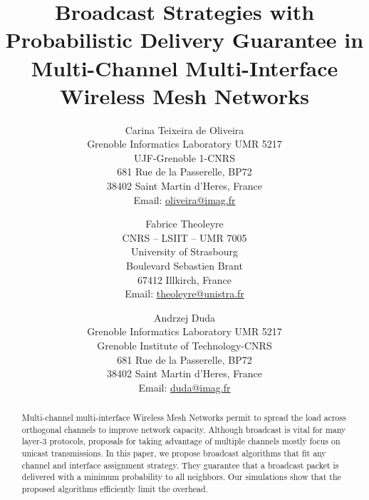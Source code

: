 \documentclass[twoside]{article}
\begin{document}
\title{\vspace{-2cm}Broadcast Strategies with Probabilistic Delivery Guarantee in Multi-Channel Multi-Interface Wireless Mesh Networks}


 
  

\author{
Carina Teixeira de Oliveira 
\vspace{0.4cm}\\
{\small Grenoble Informatics Laboratory UMR 5217}
\\
{\small  UJF-Grenoble 1-CNRS}
\\
{\small 681 Rue de la Passerelle, BP72}
\\
{\small 38402 Saint Martin d'Heres, France}
\\
{\small Email: \url{oliveira@imag.fr}}
\and Fabrice Theoleyre
\vspace{0.4cm}\\
{\small CNRS -- LSIIT  -- UMR 7005}
\\
{\small University of Strasbourg}
\\
{\small Boulevard Sebastien Brant}
\\
{\small 67412 Illkirch, France}
\\
{\small Email: \url{theoleyre@unistra.fr}}
\\[0.5cm]
\and Andrzej Duda
\vspace{0.4cm}\\
{\small Grenoble Informatics Laboratory UMR 5217}
\\
{\small  Grenoble Institute of Technology-CNRS}
\\
{\small 681 Rue de la Passerelle, BP72}
\\
{\small 38402 Saint Martin d'Heres, France}
\\
{\small Email: \url{duda@imag.fr}}
}




\date{}

        

\maketitle

\begin{abstract}
Multi-channel multi-interface Wireless Mesh Networks permit to spread the load across orthogonal channels to improve network capacity. Although broadcast is vital for many layer-3 protocols, proposals for taking advantage of multiple channels mostly focus on unicast transmissions. In this paper, we propose broadcast algorithms that fit any channel and interface assignment strategy. They guarantee that a broadcast packet is delivered with a minimum probability to all neighbors. Our simulations show that the proposed algorithms efficiently limit the overhead.
\end{abstract}
\end{document}
